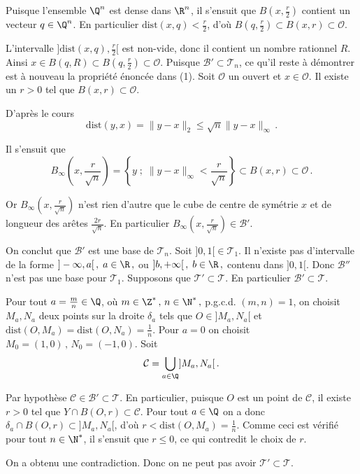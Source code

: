{\begin{enumerate}
{Puisque l'ensemble $\Q^n$ est dense dans $\R^n$, il s'ensuit que
$B\left( x, \frac{r}{2}\right)$ contient un vecteur $q\in \Q^n$.
En particulier $\mathrm{dist} (x,q)< \frac{r}{2}$, d'o\`u $B\left( q,
\frac{r}{2}\right)\subset B\left( x, r\right)\subset \mathcal{O}$.

L'intervalle $]\mathrm{dist} (x,q),\frac{r}{2}[ $ est non-vide, donc il
contient un nombre rationnel $R$. Ainsi $x\in B(q,R)\subset
B\left( q, \frac{r}{2}\right)\subset \mathcal{O}$.
Puisque $\mathcal{B}'\subset \mathcal{T}_n$, ce qu'il reste \`a d\'emontrer
est \`a nouveau la propri\'et\'e \'enonc\'ee dans (1). Soit $\mathcal{O}$
un ouvert et $x\in \mathcal{O}$. Il existe un $r>0$ tel que $B(x,r)\subset
\mathcal{O}$.

D'apr\`es le cours
$$
\mathrm{dist} (y,x)= \|y-x\|_2\leq \sqrt{n}\|y-x\|_\infty\, .
$$

Il s'ensuit que
\begin{equation}\label{bile}
B_\infty \left( x,\frac{r}{\sqrt{n}} \right) =\left\{y\; ;\;
\|y-x\|_\infty<\frac{r}{\sqrt{n}}\right\}\subset B(x,r) \subset
\mathcal{O}\, .
\end{equation}


Or $B_\infty \left( x,\frac{r}{\sqrt{n}} \right)$ n'est rien
d'autre que le cube de centre de sym\'etrie $x$ et de longueur des
ar\^etes $\frac{2r}{\sqrt{n}}$. En particulier $B_\infty \left(
x,\frac{r}{\sqrt{n}} \right)\in \mathcal{B}'$.

On conclut que $\mathcal{B}'$ est une base de $\mathcal{T}_n$.
Soit $]0,1[\in \mathcal{T}_1$. Il n'existe pas d'intervalle de la
forme $]-\infty ,a[\, ,\; a\in \R \, ,$ ou $ ]b, +\infty[\, ,\;
b\in \R \, ,$ contenu dans $]0,1[$. Donc $\mathcal{B}''$ n'est pas une
base pour $\mathcal{T}_1$.
Supposons que $\mathcal{T}'\subset \mathcal{T}$. En particulier $\mathcal{B}'\subset
\mathcal{T}$.

Pour tout $a=\frac{m}{n}\in \Q$, o\`u $m\in \Z^*\, ,\, n\in \N^*\,
,$ p.g.c.d. $(m,n)=1$, on choisit $M_a,N_a$ deux points sur la
droite $\delta_a$ tels que $O\in ]M_a,N_a[$ et $\mathrm{dist}
(O,M_a)=\mathrm{dist} (O,N_a)=\frac{1}{n}$. Pour $a=0$ on choisit
$M_0=(1,0)\, ,\, N_0=(-1,0)$. Soit
$$
\mathcal{C}=\bigcup_{a\in \Q} ]M_a,N_a[\, .
$$

Par hypoth\`ese $\mathcal{C}\in \mathcal{B}'\subset \mathcal{T}$. En particulier,
puisque $O$ est un point de $\mathcal{C}$, il existe $r>0$ tel que
$Y\cap B(O,r)\subset \mathcal{C}$. Pour tout $a\in \Q$ on a donc
$\delta_a\cap B(O,r)\subset ]M_a,N_a[$, d'o\`u $r<\mathrm{dist}
(O,M_a)=\frac{1}{n}$. Comme ceci est v\'erifi\'e pour tout $n\in
\N^*$, il s'ensuit que $r\leq 0$, ce qui contredit le choix de
$r$.

On a obtenu une contradiction. Donc on ne peut pas avoir
$\mathcal{T}'\subset \mathcal{T}$.
}
\end{enumerate}
}
